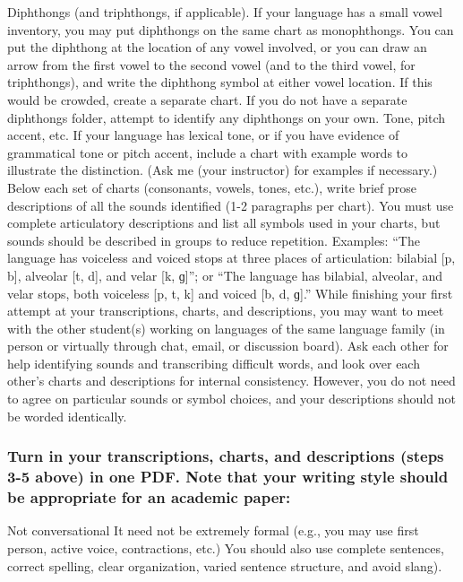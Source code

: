 \documentclass[12pt]{article}
\begin{document}
Diphthongs (and triphthongs, if applicable).  If your language has a small vowel inventory, you may put diphthongs on the same chart as monophthongs.  You can put the diphthong at the location of any vowel involved, or you can draw an arrow from the first vowel to the second vowel (and to the third vowel, for triphthongs), and write the diphthong symbol at either vowel location. If this would be crowded, create a separate chart.  If you do not have a separate diphthongs folder, attempt to identify any diphthongs on your own.
Tone, pitch accent, etc.  If your language has lexical tone, or if you have evidence of grammatical tone or pitch accent, include a chart with example words to illustrate the distinction.  (Ask me (your instructor) for examples if necessary.)
Below each set of charts (consonants, vowels, tones, etc.), write brief prose descriptions of all the sounds identified (1-2 paragraphs per chart).  You must use complete articulatory descriptions and list all symbols used in your charts, but sounds should be described in groups to reduce repetition.  Examples: “The language has voiceless and voiced stops at three places of articulation: bilabial [p, b], alveolar [t, d], and velar [k, ɡ]”; or “The language has bilabial, alveolar, and velar stops, both voiceless [p, t, k] and voiced [b, d, ɡ].”
While finishing your first attempt at your transcriptions, charts, and descriptions, you may want to meet with the other student(s) working on languages of the same language family (in person or virtually through chat, email, or discussion board).  Ask each other for help identifying sounds and transcribing difficult words, and look over each other’s charts and descriptions for internal consistency.  However, you do not need to agree on particular sounds or symbol choices, and your descriptions should not be worded identically.
\subsubsection*{Turn in your transcriptions, charts, and descriptions (steps 3-5 above) in one PDF. Note that your writing style should be appropriate for an academic paper:}
Not conversational
It need not be extremely formal (e.g., you may use first person, active voice, contractions, etc.)
You should also use complete sentences, correct spelling, clear organization, varied sentence structure, and avoid slang).
\end{document}
